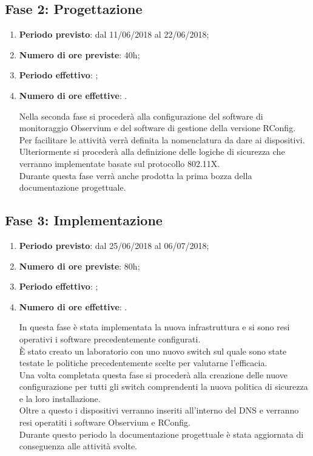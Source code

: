 \documentclass[Tesi.tex]{subfiles}
\begin{document}
\subsection{Fase 2: Progettazione}
\begin{enumerate}
	\item \textbf{Periodo previsto}: dal 11/06/2018 al 22/06/2018;
	\item \textbf{Numero di ore previste}: 40h;
	\item \textbf{Periodo effettivo}: ;
	\item \textbf{Numero di ore effettive}: .
	
Nella seconda fase si procederà alla configurazione del software di monitoraggio Observium e del software di gestione della versione RConfig. \\
Per facilitare le attività verrà definita la nomenclatura da dare ai dispositivi.\\
Ulteriormente si procederà alla definizione delle logiche di sicurezza che verranno implementate basate sul protocollo 802.11X. \\
Durante questa fase verrà anche prodotta la prima bozza della documentazione progettuale.
	
\end{enumerate}

\subsection{Fase 3: Implementazione}
\begin{enumerate}
	\item \textbf{Periodo previsto}: dal 25/06/2018 al 06/07/2018;
	\item \textbf{Numero di ore previste}: 80h;
	\item \textbf{Periodo effettivo}: ;
	\item \textbf{Numero di ore effettive}: .
	
In questa fase è stata implementata la nuova infrastruttura e si sono resi operativi i software precedentemente configurati. \\
\`{E} stato creato un laboratorio con uno nuovo switch sul quale sono state testate le politiche precedentemente scelte per valutarne l'efficacia.\\
Una volta completata questa fase si procederà alla creazione delle nuove configurazione per tutti gli switch comprendenti la nuova politica di sicurezza e la loro installazione. \\
Oltre a questo i dispositivi verranno inseriti all'interno del DNS e verranno resi operatiti i software Observium e RConfig. \\
Durante questo periodo la documentazione progettuale è stata aggiornata di conseguenza alle attività svolte.\\
	
\end{enumerate}
\end{document}
